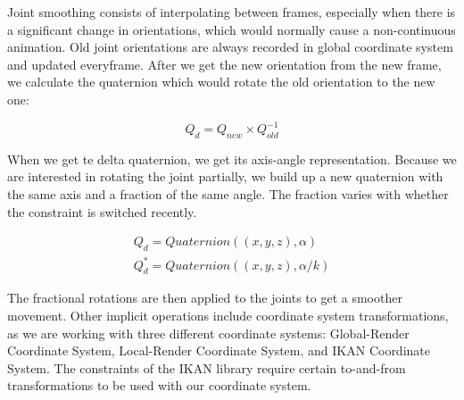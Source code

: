 Joint smoothing consists of interpolating between frames, especially when there is a significant change in orientations, which would normally cause a non-continuous animation. Old joint orientations are always recorded in global coordinate system and updated everyframe. After we get the new orientation from the new frame, we calculate the quaternion which would rotate the old orientation to the new one:

\begin{equation}
Q_{d} = Q_{new} \times Q_{old}^{-1}
\label{eqn:rotator_quaternion}
\end{equation} 

When we get te delta quaternion, we get its axis-angle representation. Because we are interested in rotating the joint partially, we build up a new quaternion with the same axis and a fraction of the same angle. The fraction varies with whether the constraint is switched recently. 

\begin{equation} 
\begin{split}
Q_{d} = \textit{Quaternion}((x, y, z), \alpha) \\  
Q_d^* = \textit{Quaternion}((x, y, z), \alpha / k )
\label{eqn:partial_rotator}
\end{split}
\end{equation} 

The fractional rotations are then applied to the joints to get a smoother movement. Other implicit operations include coordinate system transformations, as we are working with three different coordinate systems: Global-Render Coordinate System, Local-Render Coordinate System, and IKAN Coordinate System. The constraints of the IKAN library require certain to-and-from transformations to be used with our coordinate system. 